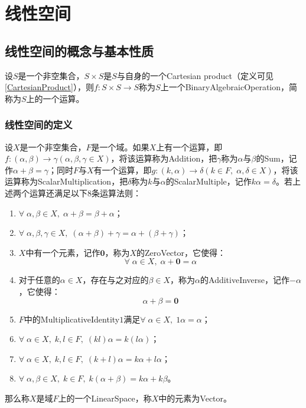 \section{线性空间}

\subsection{线性空间的概念与基本性质}

\begin{definition}
	设$S$是一个非空集合，$S\times S$是$S$与自身的一个Cartesian product（定义可见\cref{CartesianProduct}），则$f:S\times S\rightarrow S$称为$S$上一个\gls{BinaryAlgebraicOperation}，简称为$S$上的一个运算。
\end{definition}
\subsubsection{线性空间的定义}
\begin{definition}
	设$X$是一个非空集合，$F$是一个域。如果$X$上有一个运算，即$f:(\alpha,\beta)\rightarrow\gamma(\alpha,\beta,\gamma\in X)$，将该运算称为\gls{Addition}，把$\gamma$称为$\alpha$与$\beta$的\gls{Sum}，记作$\alpha+\beta=\gamma$；同时$F$与$X$有一个运算，即$g:(k,\alpha)\rightarrow\delta(k\in F,\;\alpha,\delta\in X)$，将该运算称为\gls{ScalarMultiplication}，把$\delta$称为$k$与$\alpha$的\gls{ScalarMultiple}，记作$k\alpha=\delta$。若上述两个运算还满足以下$8$条运算法则：
	\begin{enumerate}
		\item $\forall\;\alpha,\beta\in X,\;\alpha+\beta=\beta+\alpha$；
		\item $\forall\;\alpha,\beta,\gamma\in X,\;(\alpha+\beta)+\gamma=\alpha+(\beta+\gamma)$；
		\item $X$中有一个元素，记作$\mathbf{0}$，称为$X$的\gls{ZeroVector}，它使得：
		\begin{equation*}
			\forall\;\alpha\in X,\;\alpha+\mathbf{0}=\alpha
		\end{equation*}
		\item 对于任意的$\alpha\in X$，存在与之对应的$\beta\in X$，称为$\alpha$的\gls{AdditiveInverse}，记作$-\alpha$，它使得：
		\begin{equation*}
			\alpha+\beta=\mathbf{0}
		\end{equation*}
		\item $F$中的\gls{MultiplicativeIdentity}$1$满足$\forall\;\alpha\in X,\;1\alpha=\alpha$；
		\item $\forall\;\alpha\in X,\;k,l\in F,\;(kl)\alpha=k(l\alpha)$；
		\item $\forall\;\alpha\in X,\;k,l\in F,\;(k+l)\alpha=k\alpha+l\alpha$；
		\item $\forall\;\alpha,\beta\in X,\;k\in F,\;k(\alpha+\beta)=k\alpha+k\beta$。
	\end{enumerate}
	那么称$X$是域$F$上的一个\gls{LinearSpace}，称$X$中的元素为\gls{Vector}。
\end{definition}
